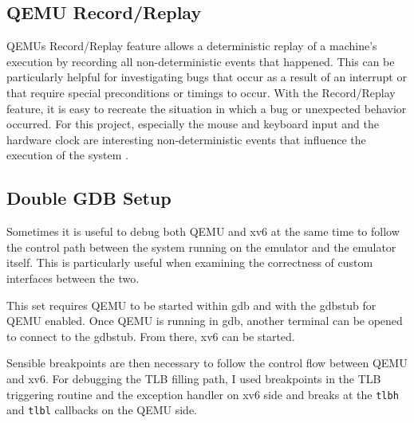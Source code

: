 

\subsection{QEMU Record/Replay}
QEMUs Record/Replay feature allows a deterministic replay of a machine's execution by recording
all non-deterministic events that happened. This can be particularly helpful for investigating bugs
that occur as a result of an interrupt or that require special preconditions or timings to occur.
With the Record/Replay feature, it is easy to recreate the situation in which a bug or unexpected
behavior occurred.
For this project, especially the mouse and keyboard input and the hardware clock are interesting
non-deterministic events that influence the execution of the system \cite{RecordReplayQEMU}.

\subsection{Double GDB Setup}

Sometimes it is useful to debug both QEMU and xv6 at the same time to follow the control path between the system running on the emulator and the emulator itself. This is particularly useful when examining the correctness of custom interfaces between the two.

This set requires QEMU to be started within gdb and with the gdbstub for QEMU enabled. Once QEMU is running in gdb, another terminal can be opened to connect to the gdbstub. From there, xv6 can be started.

Sensible breakpoints are then necessary to follow the control flow between QEMU and xv6. For debugging the TLB filling path, I used breakpoints in the TLB triggering routine and the exception handler on xv6 side and breaks at the \texttt{tlbh} and \texttt{tlbl} callbacks on the QEMU side.






